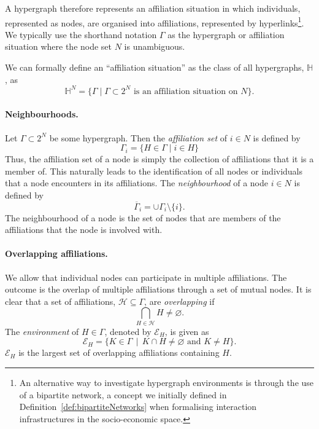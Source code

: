 A hypergraph therefore represents an affiliation situation in which individuals, represented as nodes, are organised into affiliations, represented by hyperlinks\footnote{An alternative way to investigate hypergraph environments is through the use of a bipartite network, a concept we initially defined in Definition~\ref{def:bipartiteNetworks} when formalising interaction infrastructures in the socio-economic space.}. We typically use the shorthand notation $\Gamma$ as the hypergraph or affiliation situation where the node set $N$ is unambiguous.

We can formally define an ``affiliation situation'' as the class of all hypergraphs, $\mathbb{H}$, as
\begin{equation}
\mathbb{H}^N = \{ \Gamma \mid \Gamma \subset 2^N \mbox{ is an affiliation situation on } N \} .
\end{equation}

\paragraph{Neighbourhoods.}

Let $\Gamma \subset 2^N$ be some hypergraph. Then the \emph{affiliation set} of $i \in N$ is defined by
\begin{equation}
\Gamma_i = \{ H \in \Gamma \mid i \in H \}
\end{equation}
Thus, the affiliation set of a node is simply the collection of affiliations that it is a member of. This naturally leads to the identification of all nodes or individuals that a node encounters in its affiliations. The \emph{neighbourhood} of a node $i \in N$ is defined by
\begin{equation}
\overline{\Gamma}_i = \cup \Gamma_i \setminus \{ i \}.
\end{equation}
The neighbourhood of a node is the set of nodes that are members of the affiliations that the node is involved with.

\paragraph{Overlapping affiliations.}

We allow that individual nodes can participate in multiple affiliations. The outcome is the overlap of multiple affiliations through a set of mutual nodes. It is clear that a set of affiliations, $\mathcal{H} \subseteq \Gamma$, are \emph{overlapping} if
\begin{equation}
\bigcap_{H \in \mathcal{H}} H \neq \varnothing .
\end{equation}
The \emph{environment} of $H \in \Gamma$, denoted by $\mathcal{E}_{H}$, is given as
\begin{equation}
\mathcal{E}_{H} = \{K \in \Gamma \, \mid \, K \cap H \neq \varnothing \mbox{ and } K \neq H \} .
\end{equation}
$\mathcal{E}_{H}$ is the largest set of overlapping affiliations containing $H$.

